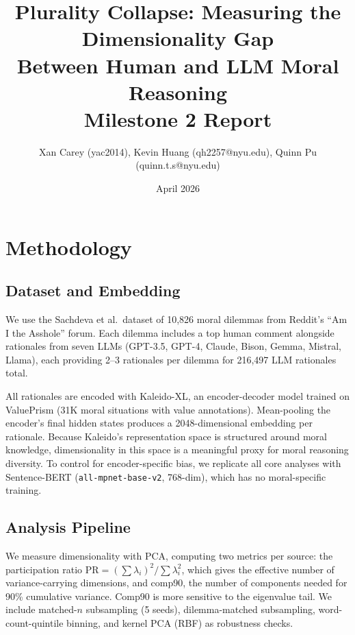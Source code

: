 \documentclass[11pt,a4paper]{article}
\title{Plurality Collapse: Measuring the Dimensionality Gap\\Between Human and LLM Moral Reasoning\\[0.3em]\large Milestone 2 Report}
\author{Xan Carey (yac2014), Kevin Huang (qh2257@nyu.edu), Quinn Pu (quinn.t.s@nyu.edu)}
\date{April 2026}
\begin{document}
\maketitle
\vspace{-1em}

\section{Methodology}

\subsection{Dataset and Embedding}

We use the Sachdeva et al.\ dataset of 10,826 moral dilemmas from Reddit's ``Am I the Asshole'' forum. Each dilemma includes a top human comment alongside rationales from seven LLMs (GPT-3.5, GPT-4, Claude, Bison, Gemma, Mistral, Llama), each providing 2--3 rationales per dilemma for 216,497 LLM rationales total.

All rationales are encoded with Kaleido-XL, an encoder-decoder model trained on ValuePrism (31K moral situations with value annotations). Mean-pooling the encoder's final hidden states produces a 2048-dimensional embedding per rationale. Because Kaleido's representation space is structured around moral knowledge, dimensionality in this space is a meaningful proxy for moral reasoning diversity. To control for encoder-specific bias, we replicate all core analyses with Sentence-BERT (\texttt{all-mpnet-base-v2}, 768-dim), which has no moral-specific training.

\subsection{Analysis Pipeline}

We measure dimensionality with PCA, computing two metrics per source: the participation ratio $\text{PR} = (\sum \lambda_i)^2 / \sum \lambda_i^2$, which gives the effective number of variance-carrying dimensions, and comp90, the number of components needed for 90\% cumulative variance. Comp90 is more sensitive to the eigenvalue tail. We include matched-$n$ subsampling (5 seeds), dilemma-matched subsampling, word-count-quintile binning, and kernel PCA (RBF) as robustness checks.
\end{document}
